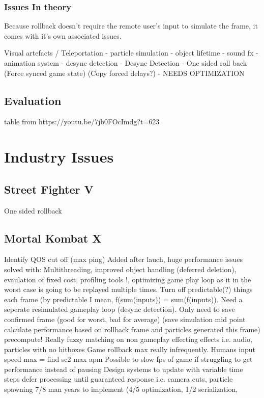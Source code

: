 \documentclass{entcs}
\begin{document}
\subsubsection{Issues In theory}
Because rollback doesn't require the remote user's input to simulate the frame, it comes with it's own associated issues.

Visual artefacts / Teleportation
- particle simulation 
- object lifetime 
- sound fx
- animation system
- desync detection
- Desync Detection
- One sided roll back (Force synced game state) (Copy forced delays?)
- NEEDS OPTIMIZATION
\subsection{Evaluation}
table from {https://youtu.be/7jb0FOcImdg?t=623}
\section{Industry Issues}

\subsection{Street Fighter V}
One sided rollback  

\subsection{Mortal Kombat X}
Identify QOS cut off (max ping)
Added after lauch, huge performance issues solved with:
Multithreading, improved object handling (deferred deletion), evaulation of fixed cost, profiling tools !, optimizing game play loop as it in the worst case is going to be replayed multiple times.
Turn off predictable(?) things each frame (by predictable I mean, f(sum(inputs)) = sum(f(inputs)).
Need a seperate resimulated gameplay loop (desync detection).
Only need to save confirmed frame (good for worst, bad for average) (save simulation mid point calculate performance based on rollback frame and particles generated this frame)
precompute!
Really fuzzy matching on non gameplay effecting effects i.e. audio, particles with no hitboxes
Game rollback max really infrequently. Humans input speed max = find sc2 max apm
Possible to slow fps of game if struggling to get performance instead of pausing
Design systems to update with variable time steps
defer processing until guaranteed response i.e. camera cuts, particle spawning
7/8 man years to implement (4/5 optimization, 1/2 serialization,
\end{document}
